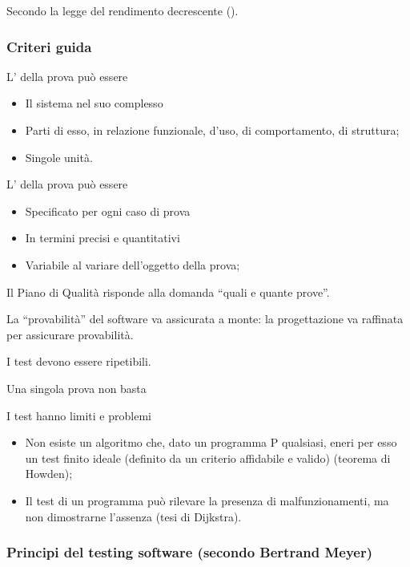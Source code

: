 Secondo la legge del rendimento decrescente ().

\subsubsection{Criteri guida}
\label{ssub:criteri_guida}

L' della prova può essere

\begin{itemize}
  \item Il sistema nel suo complesso
  \item Parti di esso, in relazione funzionale, d'uso, di comportamento, di
  struttura;
  \item Singole unità.
\end{itemize}

L' della prova può essere

\begin{itemize}
  \item Specificato per ogni caso di prova
  \item In termini precisi e quantitativi
  \item Variabile al variare dell'oggetto della prova;
\end{itemize}

Il Piano di Qualità risponde alla domanda ``quali e quante prove''.

La ``provabilità'' del software va assicurata a monte: la progettazione va
raffinata per assicurare provabilità.

I test devono essere ripetibili.

Una singola prova non basta

I test hanno limiti e problemi

\begin{itemize}
  \item Non esiste un algoritmo che, dato un programma P qualsiasi, eneri per
    esso un test finito ideale (definito da un criterio affidabile e valido)
    (teorema di Howden);
  \item Il test di un programma può rilevare la presenza di malfunzionamenti, ma
    non dimostrarne l'assenza (tesi di Dijkstra).
\end{itemize}

\subsubsection{Principi del testing software (secondo Bertrand Meyer)}
\label{ssub:principi_del_testing_software}


